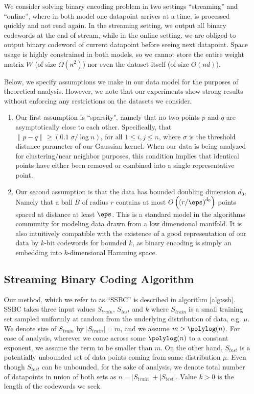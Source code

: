 \documentclass{sig-alternate}
\begin{document}
We consider solving binary encoding problem in two settings ``streaming'' and ``online'', where in both model one datapoint arrives at a time, is processed quickly and not read again. In the streaming setting, we output all binary codewords at the end of stream, while in the online setting, we are obliged to output binary codeword of current datapoint before seeing next datapoint.
Space usage is highly constrained in both models, so we cannot store the entire weight matrix $W$ (of size $\Omega(n^2)$) nor even the dataset itself (of size $O(nd)$).   

Below, we specify assumptions we make in our data model for the purposes of theoretical analysis. However, we note that our experiments show strong results without enforcing any restrictions on the datasets we consider.

\begin{enumerate}
\item{Our first assumption is ``sparsity", namely that no two points $p$ and $q$ are asymptotically close to each other. Specifically, that $\|p - q \| \geq (0.1\; \sigma/\log n)$, for all $1 \leq i,j \leq n$, where $\sigma$ is the threshold distance parameter of our Gaussian kernel. When our data is being analyzed for clustering/near neighbor purposes, this condition implies that identical points have either been removed or combined into a single representative point.}
\item{Our second assumption is that the data has bounded doubling dimension $d_0$. Namely that a ball $B$ of radius $r$ contains at most $O \left( \left( r/\eps \right)^{d_0}\right)$ points spaced at distance at least $\eps$. This is a standard model in the algorithms community for modeling data drawn from a low dimensional manifold. It is also intuitively compatible with the existence of a good representation of our data by $k$-bit codewords for bounded $k$, as binary encoding is simply an embedding into $k$-dimensional Hamming space.}
\end{enumerate}


\subsection{Streaming Binary Coding Algorithm}
Our method, which we refer to as ``SSBC'' is described in algorithm \ref{alg:ssh}.
SSBC takes three input values $S_{train}$, $S_{test}$ and $k$ where $S_{train}$ is a small training set sampled uniformly at random from the underlying distribution of data, e.g. $\mu$. We denote size of $S_{train}$ by $|S_{train}| = m$, and we assume $m > \polylog(n)$. For ease of analysis, wherever we come across some $\polylog(n)$ to a constant exponent, we assume the term to be smaller than $m$.
On the other hand, $S_{test}$ is a potentially unbounded set of data points coming from same distribution $\mu$. Even though $S_{test}$ can be unbounded, for the sake of analysis, we denote total number of datapoints in union of both sets as $n = |S_{train}| + |S_{test}|$.
Value $k > 0$ is the length of the codewords we seek.
\end{document}
